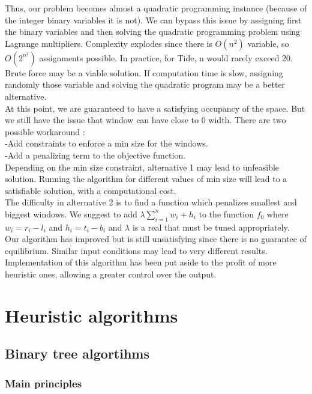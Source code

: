 \documentclass{acmtog}
\begin{document}
Thus, our problem becomes almost a quadratic programming instance (because of the integer binary variables it is not).
We can bypass this issue by assigning first the binary variables and then solving the quadratic programming problem using Lagrange multipliers.  %
Complexity explodes since there is $O(n^2)$ variable, so $O(2^{n^2})$ assignments possible. In practice, for Tide, n would rarely exceed 20. Brute force may be a viable solution. If computation time is slow, assigning randomly those variable and solving the quadratic program may be a better alternative. \\
At this point, we are guaranteed to have a satisfying occupancy of the space. But we still have the issue that window can have close to 0 width. There are two possible workaround : \\
-Add constraints to enforce a min size for the windows. \\%
-Add a penalizing term to the objective function. \\
Depending on the min size constraint, alternative 1 may lead to unfeasible solution. Running the algorithm for different values of min size will lead to a satisfiable solution, with a computational cost. \\
The difficulty in alternative 2 is to find a function which penalizes smallest and biggest windows. We suggest to add $\lambda \sum_{i = 1}^{n}{w_i + h_i}$ to the function $f_0$ where $w_i = r_i - l_i$ and $h_i = t_i - b_i$ and $\lambda$ is a real that must be tuned appropriately. \\
Our algorithm has improved but is still unsatisfying since there is no guarantee of equilibrium. %
Similar input conditions may lead to very different results. Implementation of this algorithm has been put aside to the profit of more heuristic ones, allowing a greater control over the output.


\section{Heuristic algorithms}

\subsection{Binary tree algortihms}

\subsubsection{Main principles}
\end{document}
